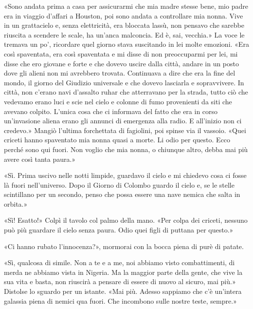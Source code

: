 «Sono andata prima a casa per assicurarmi che mia madre stesse bene, mio
padre era in viaggio d'affari a Houston, poi sono andata a controllare
mia nonna. Vive in un grattacielo e, senza elettricità, era bloccata
lassù, non pensavo che sarebbe riuscita a scendere le scale, ha un'anca
malconcia. Ed è, sai, vecchia.» La voce le tremava un po', ricordare
quel giorno stava suscitando in lei molte emozioni. «Era così
spaventata, era così spaventata e mi disse di non preoccuparmi per lei,
mi disse che ero giovane e forte e che dovevo uscire dalla città, andare
in un posto dove gli alieni non mi avrebbero trovata. Continuava a dire
che era la fine del mondo, il giorno del Giudizio universale e che
dovevo lasciarla e sopravvivere. In città, non c'erano navi d'assalto
ruhar che atterravano per la strada, tutto ciò che vedevamo erano luci e
scie nel cielo e colonne di fumo provenienti da siti che avevano
colpito. L'unica cosa che ci informava del fatto che era in corso
un'invasione aliena erano gli annunci di emergenza alla radio. E
all'inizio non ci credevo.» Mangiò l'ultima forchettata di fagiolini,
poi spinse via il vassoio. «Quei criceti hanno spaventato mia nonna
quasi a morte. Li odio per questo. Ecco perché sono qui fuori. Non
voglio che mia nonna, o chiunque altro, debba mai più avere così tanta
paura.»

«Sì. Prima uscivo nelle notti limpide, guardavo il cielo e mi chiedevo
cosa ci fosse là fuori nell'universo. Dopo il Giorno di Colombo guardo
il cielo e, se le stelle scintillano per un secondo, penso che possa
essere una nave nemica che salta in orbita.»

«Sì! Esatto!» Colpì il tavolo col palmo della mano. «Per colpa dei
criceti, nessuno può più guardare il cielo senza paura. Odio quei figli
di puttana per questo.»

«Ci hanno rubato l'innocenza?», mormorai con la bocca piena di purè di
patate.

«Sì, qualcosa di simile. Non a te e a me, noi abbiamo visto
combattimenti, di merda ne abbiamo vista in Nigeria. Ma la maggior parte
della gente, che vive la sua vita e basta, non riuscirà a pensare di
essere di nuovo al sicuro, mai più.» Distolse lo sguardo per un istante.
«Mai più. Adesso sappiamo che c'è un'intera galassia piena di nemici qua
fuori. Che incombono sulle nostre teste, sempre.»

